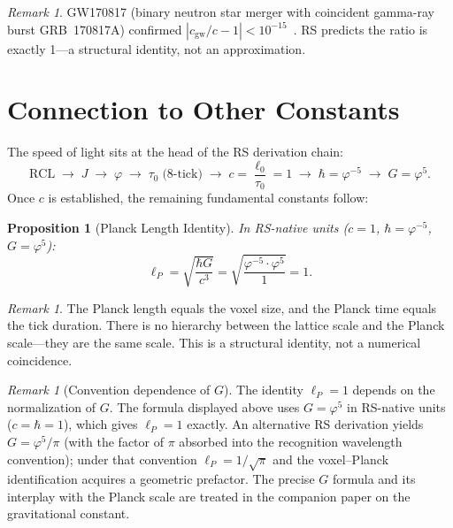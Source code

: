 \documentclass[12pt,a4paper]{article}
\newtheorem{proposition}[theorem]{Proposition}
\theoremstyle{definition}
\theoremstyle{remark}
\newtheorem{remark}[theorem]{Remark}
\begin{document}
\begin{remark}
GW170817 (binary neutron star merger with coincident gamma-ray burst
GRB~170817A) confirmed $|c_{\mathrm{gw}}/c - 1| < 10^{-15}$~\cite{GW170817}.
RS predicts the ratio is exactly 1---a structural identity, not an
approximation.
\end{remark}

\section{Connection to Other Constants}
\label{sec:constants}

The speed of light sits at the head of the RS derivation chain:
\begin{equation}
  \mathrm{RCL} \;\to\; J \;\to\; \varphi \;\to\;
  \tau_0\;\text{(8-tick)} \;\to\;
  \boxed{c = \frac{\ell_0}{\tau_0} = 1} \;\to\;
  \hbar = \varphi^{-5} \;\to\; G = \varphi^5.
\end{equation}
Once $c$ is established, the remaining fundamental constants follow:

\begin{proposition}[Planck Length Identity]
\label{prop:planck}
In RS-native units ($c = 1$, $\hbar = \varphi^{-5}$,
$G = \varphi^5$):
\begin{equation}
  \ell_P = \sqrt{\frac{\hbar G}{c^3}}
  = \sqrt{\frac{\varphi^{-5} \cdot \varphi^5}{1}}
  = 1.
\end{equation}
\end{proposition}

\begin{remark}
The Planck length equals the voxel size, and the Planck time
equals the tick duration.  There is no hierarchy between the lattice
scale and the Planck scale---they are the same scale.  This is a
structural identity, not a numerical coincidence.
\end{remark}

\begin{remark}[Convention dependence of $G$]
\label{rem:G-convention}
The identity $\ell_P = 1$ depends on the normalization of $G$.
The formula displayed above uses $G = \varphi^5$ in RS-native
units ($c = \hbar = 1$), which gives $\ell_P = 1$ exactly.
An alternative RS derivation yields $G = \varphi^5/\pi$ (with
the factor of $\pi$ absorbed into the recognition wavelength
convention); under that convention $\ell_P = 1/\sqrt{\pi}$
and the voxel--Planck identification acquires a geometric
prefactor.  The precise $G$ formula and its interplay with the
Planck scale are treated in the companion paper on the
gravitational constant.
\end{remark}
\end{document}
